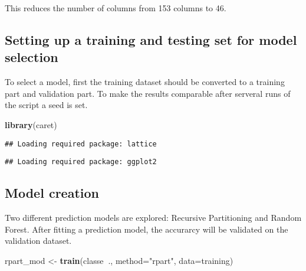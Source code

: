 \documentclass[]{article}
\newenvironment{Shaded}{\begin{snugshade}}{\end{snugshade}}
\newcommand{\KeywordTok}[1]{\textcolor[rgb]{0.13,0.29,0.53}{\textbf{#1}}}
\newcommand{\DataTypeTok}[1]{\textcolor[rgb]{0.13,0.29,0.53}{#1}}
\newcommand{\DecValTok}[1]{\textcolor[rgb]{0.00,0.00,0.81}{#1}}
\newcommand{\FloatTok}[1]{\textcolor[rgb]{0.00,0.00,0.81}{#1}}
\newcommand{\StringTok}[1]{\textcolor[rgb]{0.31,0.60,0.02}{#1}}
\newcommand{\OperatorTok}[1]{\textcolor[rgb]{0.81,0.36,0.00}{\textbf{#1}}}
\newcommand{\NormalTok}[1]{#1}
\begin{document}
This reduces the number of columns from 153 columns to 46.

\subsection{Setting up a training and testing set for model
selection}\label{setting-up-a-training-and-testing-set-for-model-selection}

To select a model, first the training dataset should be converted to a
training part and validation part. To make the results comparable after
serveral runs of the script a seed is set.

\begin{Shaded}
\begin{Highlighting}[]
\KeywordTok{library}\NormalTok{(caret)}
\end{Highlighting}
\end{Shaded}

\begin{verbatim}
## Loading required package: lattice
\end{verbatim}

\begin{verbatim}
## Loading required package: ggplot2
\end{verbatim}

\begin{Shaded}
\end{Shaded}

\subsection{Model creation}\label{model-creation}

Two different prediction models are explored: Recursive Partitioning and
Random Forest. After fitting a prediction model, the accurarcy will be
validated on the validation dataset.

\begin{Shaded}
\begin{Highlighting}[]
\NormalTok{rpart_mod <-}\StringTok{ }\KeywordTok{train}\NormalTok{(classe}\OperatorTok{~}\NormalTok{., }\DataTypeTok{method=}\StringTok{"rpart"}\NormalTok{, }\DataTypeTok{data=}\NormalTok{training)}
\end{Highlighting}
\end{Shaded}
\end{document}
